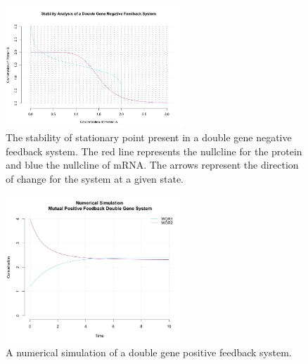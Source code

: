 \documentclass[]{article}
\begin{document}
            \begin{figure}[h]
            \centering
            \includegraphics[width=0.6\textwidth]{./figures/stabilityDoubleNegative.jpeg}
            \caption{The stability of stationary point present in a double gene negative feedback system. The red line represents the nullcline for the protein and blue the nullcline of mRNA. The arrows represent the direction of change for the system at a given state.}
            \label{stabilityDoubleNegative}
            \end{figure}
 

            \begin{figure}[h]
            \centering
            \includegraphics[width=0.6\textwidth]{./figures/simDoublePos.jpeg}
            \caption{A numerical simulation of a double gene positive feedback system.}
            \label{simDoublePos}
            \end{figure}



\end{document}
